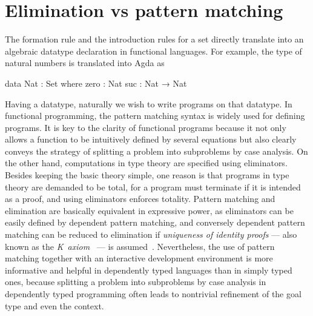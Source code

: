 \section{Elimination vs pattern matching}
\label{sec:pattern-matching}

The formation rule and the introduction rules for a set directly translate into an algebraic datatype declaration in functional languages. For example, the type of natural numbers is translated into Agda as
\begin{code}
data Nat : Set where
  zero : Nat
  suc : Nat → Nat
\end{code}
Having a datatype, naturally we wish to write programs on that datatype.
In functional programming, the pattern matching syntax is widely used for defining programs.
It is key to the clarity of functional programs because it not only allows a function to be intuitively defined by several equations but also clearly conveys the strategy of splitting a problem into subproblems by case analysis.
On the other hand, computations in type theory are specified using eliminators.
Besides keeping the basic theory simple, one reason is that programs in type theory are demanded to be total, for a program must terminate if it is intended as a proof, and using eliminators enforces totality.
Pattern matching and elimination are basically equivalent in expressive power, as eliminators can be easily defined by dependent pattern matching, and conversely dependent pattern matching can be reduced to elimination if \emph{uniqueness of identity proofs} --- also known as the \emph{K~axiom}~\citep{Streicher-ITT} --- is assumed~\citep{Goguen-elim}.
Nevertheless, the use of pattern matching together with an interactive development environment is more informative and helpful in dependently typed languages than in simply typed ones, because splitting a problem into subproblems by case analysis in dependently typed programming often leads to nontrivial refinement of the goal type and even the context.

